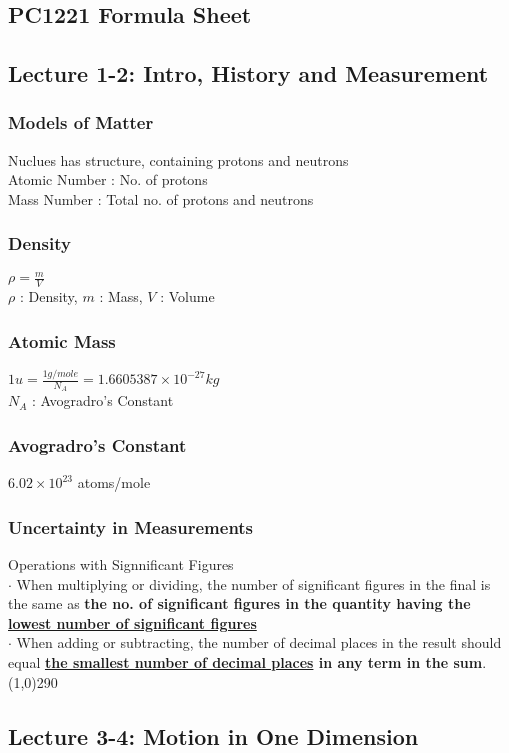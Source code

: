 \documentclass[10 pt]{article}
\begin{document}
\begin{multicols}{2}
\section*{PC1221 Formula Sheet}
\subsection*{Lecture 1-2: Intro, History and Measurement}
\subsubsection*{Models of Matter}
Nuclues has structure, containing protons and neutrons\\
Atomic Number : No. of protons\\
Mass Number : Total no. of protons and neutrons
\subsubsection*{Density}
$\rho = \frac{m}{V}$\\
$\rho$ : Density, $m$ : Mass, $V$ : Volume
\subsubsection*{Atomic Mass}
$ 1 u = \frac{1g/mole}{N_A} = 1.6605387 \times 10^{-27} kg$\\
$N_A$ : Avogradro's Constant
\subsubsection*{Avogradro's Constant}
$ 6.02 \times 10^{23} $ atoms/mole
\subsubsection*{Uncertainty in Measurements}
Operations with Signnificant Figures\\
$\cdot$ When multiplying or dividing, the number of significant figures in the final is the same as \textbf{the no. of significant figures in the quantity having the \underline{lowest number of significant figures}}\\
$\cdot$ When adding or subtracting, the number of decimal places in the result should equal \textbf{\underline{the smallest number of decimal places} in any term in the sum}.
\\
\line(1,0){290}
\subsection*{Lecture 3-4: Motion in One Dimension}

\end{multicols}
\end{document}
